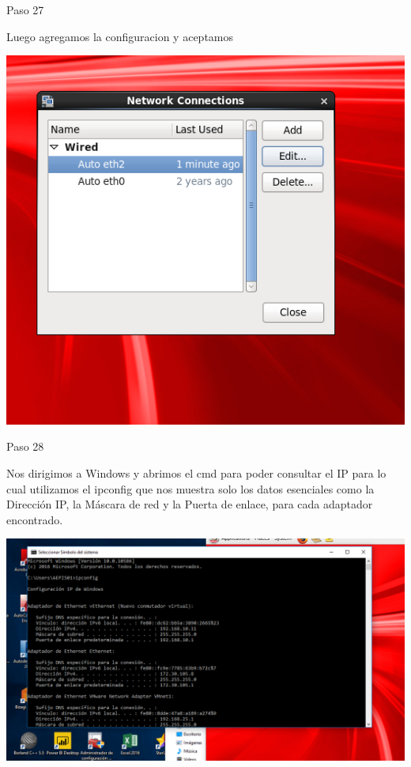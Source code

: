 \begin{itemize}
\begin{center}
    Paso 27
\end{center}

    Luego agregamos la configuracion y aceptamos\\
	\begin{center}
	\includegraphics[width=15cm]{./Imagenes/imagen27} 
	\end{center}

\end{itemize} 

\begin{itemize}
\begin{center}
    Paso 28
\end{center}

    Nos dirigimos a Windows y abrimos el cmd para poder consultar el IP para lo cual utilizamos el ipconfig que nos muestra solo los datos esenciales como la Dirección IP, la Máscara de red y la Puerta de enlace, para cada adaptador encontrado.\\
	\begin{center}
	\includegraphics[width=15cm]{./Imagenes/imagen28} 
	\end{center}

\end{itemize} 

